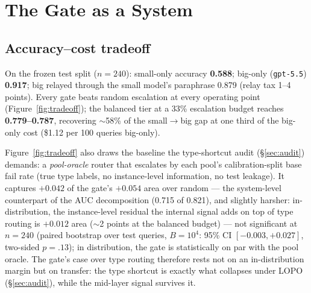 \section{The Gate as a System}
\label{sec:system}

\subsection{Accuracy--cost tradeoff}

On the frozen test split ($n=240$): small-only accuracy \textbf{0.588};
big-only (\texttt{gpt-5.5}) \textbf{0.917}; big relayed through the small
model's paraphrase 0.879 (relay tax 1--4 points). Every gate beats random
escalation at every operating point (Figure~\ref{fig:tradeoff}); the
balanced tier at a 33\% escalation budget reaches \textbf{0.779--0.787},
recovering $\sim$58\% of the small$\rightarrow$big gap at one third of the
big-only cost (\$1.12 per 100 queries big-only).

Figure~\ref{fig:tradeoff} also draws the baseline the type-shortcut audit
(\S\ref{sec:audit}) demands: a \emph{pool-oracle} router that escalates by
each pool's calibration-split base fail rate (true type labels, no
instance-level information, no test leakage). It captures $+0.042$ of the
gate's $+0.054$ area over random --- the system-level counterpart of the
AUC decomposition (0.715 of 0.821), and slightly harsher: in-distribution,
the instance-level residual the internal signal adds on top of type
routing is $+0.012$ area ($\sim$2 points at the balanced budget) --- not
significant at $n{=}240$ (paired bootstrap over test queries, $B{=}10^4$:
95\% CI $[-0.003, +0.027]$, two-sided $p{=}.13$); in distribution, the
gate is statistically on par with the pool oracle. The gate's case over
type routing therefore rests not on an in-distribution margin but on
transfer: the type shortcut is exactly what
collapses under LOPO (\S\ref{sec:audit}), while the mid-layer signal
survives it.

